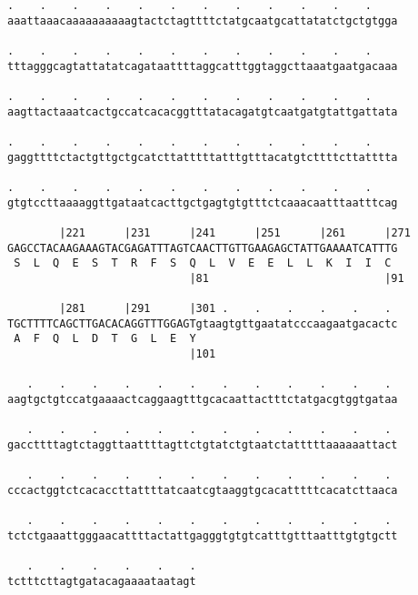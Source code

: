 \documentclass{article}
\begin{document}
\begin{Verbatim}
.    .    .    .    .    .    .    .    .    .    .    .    
aaattaaacaaaaaaaaaagtactctagttttctatgcaatgcattatatctgctgtgga
                                                            
.    .    .    .    .    .    .    .    .    .    .    .    
tttagggcagtattatatcagataattttaggcatttggtaggcttaaatgaatgacaaa
                                                            
.    .    .    .    .    .    .    .    .    .    .    .    
aagttactaaatcactgccatcacacggtttatacagatgtcaatgatgtattgattata
                                                            
.    .    .    .    .    .    .    .    .    .    .    .    
gaggttttctactgttgctgcatcttatttttatttgtttacatgtcttttcttatttta
                                                            
.    .    .    .    .    .    .    .    .    .    .    .    
gtgtccttaaaaggttgataatcacttgctgagtgtgtttctcaaacaatttaatttcag
                                                            
        |221      |231      |241      |251      |261      |271
GAGCCTACAAGAAAGTACGAGATTTAGTCAACTTGTTGAAGAGCTATTGAAAATCATTTG
 S  L  Q  E  S  T  R  F  S  Q  L  V  E  E  L  L  K  I  I  C 
                            |81                           |91
  
        |281      |291      |301 .    .    .    .    .    . 
TGCTTTTCAGCTTGACACAGGTTTGGAGTgtaagtgttgaatatcccaagaatgacactc
 A  F  Q  L  D  T  G  L  E  Y                               
                            |101                            
  
   .    .    .    .    .    .    .    .    .    .    .    . 
aagtgctgtccatgaaaactcaggaagtttgcacaattactttctatgacgtggtgataa
                                                            
   .    .    .    .    .    .    .    .    .    .    .    . 
gaccttttagtctaggttaattttagttctgtatctgtaatctatttttaaaaaattact
                                                            
   .    .    .    .    .    .    .    .    .    .    .    . 
cccactggtctcacaccttattttatcaatcgtaaggtgcacatttttcacatcttaaca
                                                            
   .    .    .    .    .    .    .    .    .    .    .    . 
tctctgaaattgggaacattttactattgagggtgtgtcatttgtttaatttgtgtgctt
                                                            
   .    .    .    .    .    .
tctttcttagtgatacagaaaataatagt
                             

\end{Verbatim}
\end{document}
